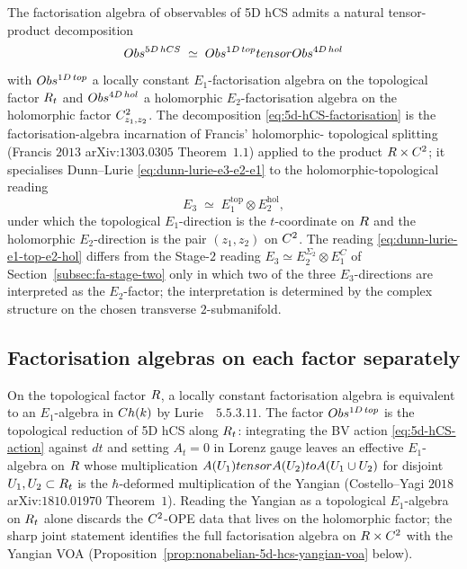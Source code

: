 The factorisation algebra of observables of 5D hCS admits a natural
tensor-product decomposition
\begin{equation}
\label{eq:5d-hCS-factorisation}
  Obs^{5D\,hCS} \;\simeq\;
  Obs^{1D\,top} tensor Obs^{4D\,hol}
\end{equation}
with $Obs^{1D\,top}$ a locally constant $E_1$-factorisation
algebra on the topological factor $R_t$ and $Obs^{4D\,hol}$
a holomorphic $E_2$-factorisation algebra on the holomorphic factor
$C^2_{z_1, z_2}$. The decomposition \eqref{eq:5d-hCS-factorisation}
is the factorisation-algebra incarnation of Francis' holomorphic-
topological splitting (Francis $2013$ arXiv:$1303.0305$ Theorem~$1.1$)
applied to the product $R \times C^2$; it specialises Dunn--Lurie
\eqref{eq:dunn-lurie-e3-e2-e1} to the holomorphic-topological reading
\begin{equation}
\label{eq:dunn-lurie-e1-top-e2-hol}
  E_3 \;\simeq\; E_1^{\mathrm{top}} \otimes E_2^{\mathrm{hol}},
\end{equation}
under which the topological $E_1$-direction is the $t$-coordinate on
$R$ and the holomorphic $E_2$-direction is the pair $(z_1, z_2)$ on
$C^2$. The reading \eqref{eq:dunn-lurie-e1-top-e2-hol} differs from
the Stage-$2$ reading $E_3 \simeq E_2^{\Sigma_2} \otimes E_1^{C}$ of
Section~\ref{subsec:fa-stage-two} only in which two of the three
$E_3$-directions are interpreted as the $E_2$-factor; the
interpretation is determined by the complex structure on the chosen
transverse $2$-submanifold.

\subsection{Factorisation algebras on each factor separately}

On the topological factor $R$, a locally constant factorisation algebra
is equivalent to an $E_1$-algebra in $Ch(k)$ by
Lurie~\cite{LurieHA}~$5.5.3.11$. The factor $Obs^{1D\,top}$
is the topological reduction of 5D hCS along $R_t$: integrating the
BV action \eqref{eq:5d-hCS-action} against $dt$ and setting
$A_t = 0$ in Lorenz gauge leaves an effective $E_1$-algebra on $R$
whose multiplication $A(U_1) tensor A(U_2) to A(U_1 \cup U_2)$
for disjoint $U_1, U_2 \subset R_t$ is the $\hbar$-deformed
multiplication of the Yangian (Costello--Yagi $2018$
arXiv:$1810.01970$ Theorem~$1$). Reading the Yangian as a topological
$E_1$-algebra on $R_t$ alone discards the $C^2$-OPE data that lives
on the holomorphic factor; the sharp joint statement identifies the
full factorisation algebra on $R \times C^2$ with the Yangian VOA
(Proposition~\ref{prop:nonabelian-5d-hcs-yangian-voa} below).

